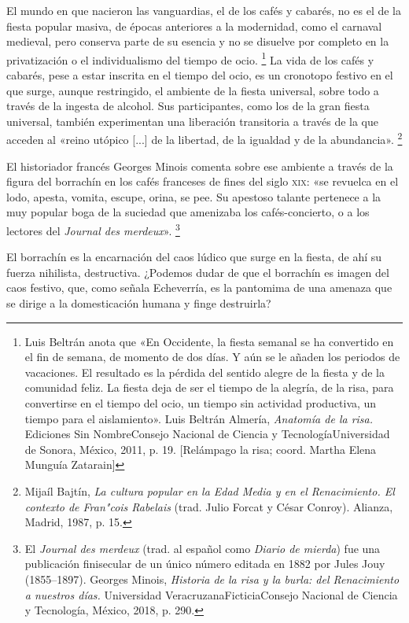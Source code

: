 \documentclass[14pt,twoside,final]{extbook} %
\let\oldfootnote\footnote
\renewcommand\footnote[1]{%
\oldfootnote{\hspace{1mm}#1}}
\begin{document}
El mundo en que nacieron las vanguardias, el de los cafés y cabarés, no es el de la fiesta popular masiva, de épocas anteriores a la modernidad, como el carnaval medieval, pero conserva parte de su
esencia y no se disuelve por completo en la privatización o el individualismo del tiempo de ocio.\footnote{Luis Beltrán anota que «En Occidente, la fiesta semanal se ha convertido en el fin de semana, de momento de dos días. Y aún se le añaden los periodos de vacaciones. El resultado es la pérdida del sentido alegre de la fiesta y de la comunidad feliz. La fiesta deja de ser el tiempo de la alegría, de la risa, para convertirse en el tiempo del ocio, un tiempo sin actividad productiva, un tiempo para el aislamiento». Luis Beltrán Almería, \emph{Anatomía de la risa.} Ediciones Sin Nombre\kernedslash Consejo Nacional de Ciencia y Tecnología\kernedslash Universidad de Sonora, México, 2011, p. 19. [Relámpago la risa; coord. Martha Elena Munguía Zatarain]} La vida de los cafés y cabarés, pese a estar inscrita en el tiempo del ocio, es un cronotopo festivo en el que surge, aunque restringido, el ambiente de la fiesta universal, sobre todo a través de la ingesta de alcohol. Sus participantes, como los de la gran fiesta universal, también experimentan una liberación transitoria a través de la que acceden al «reino utópico [...] de la libertad, de la igualdad y de la abundancia».\footnote{Mijaíl Bajtín, \emph{La cultura popular en la Edad Media y en el Renacimiento. El contexto de Fran"cois Rabelais} (trad. Julio Forcat y César Conroy). Alianza, Madrid, 1987, p. 15.}

El historiador francés Georges Minois comenta sobre ese ambiente a través de la figura del borrachín en los cafés franceses de fines del siglo \textsc{xix}: «se revuelca en el lodo, apesta, vomita, escupe, orina, se pee. Su apestoso talante pertenece a la muy popular boga de la suciedad que amenizaba los cafés-concierto, o a los lectores del \emph{Journal des merdeux}».\footnote{El \emph{Journal des merdeux} (trad. al español como \emph{Diario de mierda}) fue una publicación finisecular de un único número editada en 1882 por Jules Jouy (1855--1897). Georges Minois, \emph{Historia de la risa y la burla: del Renacimiento a nuestros días.} Universidad Veracruzana\kernedslash Ficticia\kernedslash Consejo Nacional de Ciencia y Tecnología, México, 2018, p. 290.}

El borrachín es la encarnación del caos lúdico que surge en la fiesta, de ahí su fuerza nihilista, destructiva. ¿Podemos dudar de que el borrachín es imagen del caos festivo, que, como señala Echeverría, es la pantomima de una amenaza que se dirige a la domesticación humana y finge destruirla?
\end{document}
